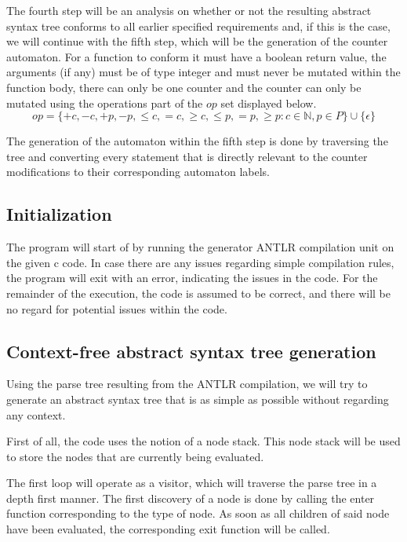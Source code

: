 \documentclass[12pt]{article}
\begin{document}
The fourth step will be an analysis on whether or not the resulting abstract syntax tree conforms to all earlier specified requirements and, if this is the case, we will continue with the fifth step, which will be the generation of the counter automaton. For a function to conform it must have a boolean return value, the arguments (if any) must be of type integer and must never be mutated within the function body, there can only be one counter and the counter can only be mutated using the operations part of the $op$ set displayed below.
\[
op = \{+c, -c, +p, -p, \leq c, =c, \geq c, \leq p, =p, \geq p: c \in \mathbb{N}, p \in P\} \cup \{\epsilon\}
\]

The generation of the automaton within the fifth step is done by traversing the tree and converting every statement that is directly relevant to the counter modifications to their corresponding automaton labels.

\subsection{Initialization}
The program will start of by running the generator ANTLR compilation unit on the given c code. In case there are any issues regarding simple compilation rules, the program will exit with an error, indicating the issues in the code. For the remainder of the execution, the code is assumed to be correct, and there will be no regard for potential issues within the code.

\subsection{Context-free abstract syntax tree generation}
Using the parse tree resulting from the ANTLR compilation, we will try to generate an abstract syntax tree that is as simple as possible without regarding any context. 

First of all, the code uses the notion of a node stack. This node stack will be used to store the nodes that are currently being evaluated.

The first loop will operate as a visitor, which will traverse the parse tree in a depth first manner. The first discovery of a node is done by calling the enter function corresponding to the type of node. As soon as all children of said node have been evaluated, the corresponding exit function will be called. 
\end{document}
